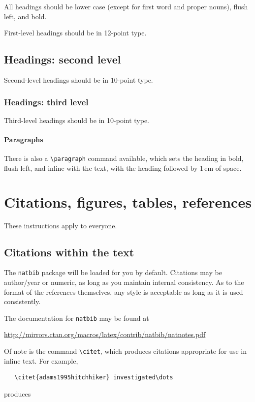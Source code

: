 \documentclass{article}
\begin{document}
All headings should be lower case (except for first word and proper nouns),
flush left, and bold.

First-level headings should be in 12-point type.

\subsection{Headings: second level}

Second-level headings should be in 10-point type.

\subsubsection{Headings: third level}

Third-level headings should be in 10-point type.

\paragraph{Paragraphs}

There is also a \verb+\paragraph+ command available, which sets the heading in
bold, flush left, and inline with the text, with the heading followed by 1\,em
of space.

\section{Citations, figures, tables, references}
\label{others}

These instructions apply to everyone.

\subsection{Citations within the text}

The \verb+natbib+ package will be loaded for you by default.  Citations may be
author/year or numeric, as long as you maintain internal consistency.  As to the
format of the references themselves, any style is acceptable as long as it is
used consistently.

The documentation for \verb+natbib+ may be found at
\begin{center}
  \url{http://mirrors.ctan.org/macros/latex/contrib/natbib/natnotes.pdf}
\end{center}
Of note is the command \verb+\citet+, which produces citations appropriate for
use in inline text.  For example,
\begin{verbatim}
   \citet{adams1995hitchhiker} investigated\dots
\end{verbatim}
produces
\end{document}
